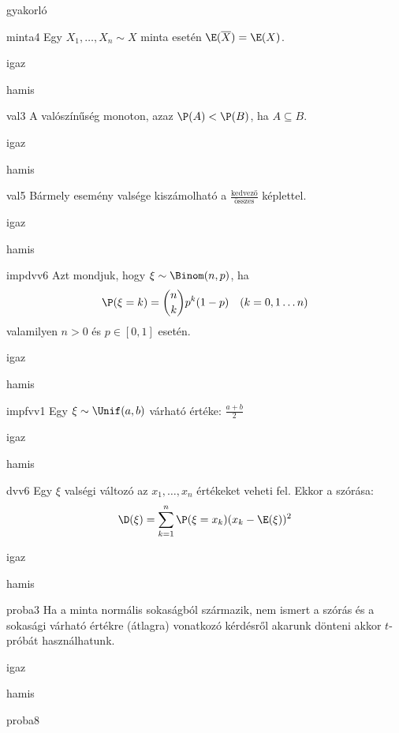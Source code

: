 \documentclass[12pt]{article}
\begin{document}
\begin{quiz}{gyakorló}
\begin{multi}[feedback={A mintaátlag torzítatlan becslése a sokasági (elméleti) várható értéknek (átlagnak)}]{minta4}
Egy $X_1,\ldots,X_n\sim X$ minta esetén $\E(\overline{X})=\E(X)$.
\item* igaz
\item hamis
\end{multi}
\begin{multi}[feedback={$A=B$?}]{val3}
A valószínűség monoton, azaz $\P(A)<\P(B)$, ha $A\subseteq B$.
\item igaz
\item* hamis
\end{multi}
\begin{multi}[feedback={Csak ha az elemi események egyforma valségűek.}]{val5}
Bármely esemény valsége kiszámolható a $\frac{\text{kedvező}}{\text{összes}}$ képlettel.
\item igaz
\item* hamis
\end{multi}
\begin{multi}[feedback={Def.}]{impdvv6}
Azt mondjuk, hogy $\xi\sim \Binom(n,p)$, ha 
$$
\P(\xi=k)=\binom{n}{k}p^k(1-p)\ \ \ (k=0,1\ldots n)
$$
valamilyen $n>0$ és $p\in[0,1]$ esetén.
\item igaz
\item* hamis
\end{multi}
\begin{multi}[feedback={wiki}]{impfvv1}
Egy $\xi\sim \Unif(a,b)$ várható értéke: $\frac{a+b}{2}$
\item* igaz
\item hamis
\end{multi}
\begin{multi}[feedback={Def.}]{dvv6}
Egy $\xi$ valségi változó az $x_1,\ldots, x_n$ értékeket veheti fel. Ekkor a szórása:
$$
\D(\xi)=\sum_{k=1}^n \P(\xi=x_k)(x_k-\E(\xi))^2
$$
\item igaz
\item* hamis
\end{multi}
\begin{multi}[feedback={Ezek az $t$-próba használatának előzményei.}]{proba3}
Ha a minta normális sokaságból származik, nem ismert a szórás és a sokasági várható értékre (átlagra) vonatkozó kérdésről 
akarunk dönteni akkor $t$-próbát használhatunk.
\item* igaz
\item hamis
\end{multi}
\begin{multi}[feedback={A fenti formula a $u$-próba ún. próbastatisztikája.}]{proba8}

\end{multi}
\end{quiz}
\end{document}
